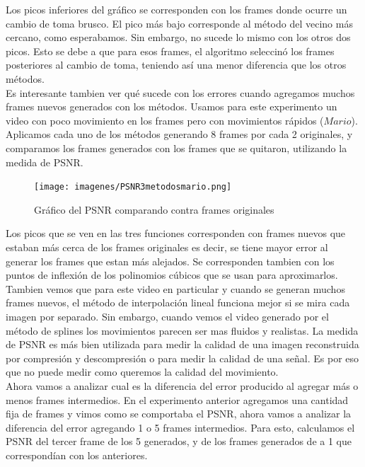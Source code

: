 Los picos inferiores del gráfico se corresponden con los frames donde ocurre un cambio de toma brusco. El pico más bajo corresponde al método del vecino más cercano, como esperabamos. Sin embargo, no sucede lo mismo con los otros dos picos. Esto se debe a que para esos frames, el algoritmo seleccinó los frames posteriores al cambio de toma, teniendo así una menor diferencia que los otros métodos.\\

Es interesante tambien ver qué sucede con los errores cuando agregamos muchos frames nuevos generados con los métodos. Usamos para este experimento un video con poco movimiento en los frames pero con movimientos rápidos ($Mario$). Aplicamos cada uno de los métodos generando 8 frames por cada 2 originales, y comparamos los frames generados con los frames que se quitaron, utilizando la medida de PSNR.

\begin{figure}[h!]
  \caption{Gráfico del PSNR comparando contra frames originales}
  \centering
    \texttt{[image: imagenes/PSNR3metodosmario.png]}
\end{figure}


Los picos que se ven en las tres funciones corresponden con frames nuevos que estaban más cerca de los frames originales es decir, se tiene mayor error al generar los frames que estan más alejados. Se corresponden tambien con los puntos de inflexión de los polinomios cúbicos que se usan para aproximarlos.\\

Tambien vemos que para este video en particular y cuando se generan muchos frames nuevos, el método de interpolación lineal funciona mejor si se mira cada imagen por separado. Sin embargo, cuando vemos el video generado por el método de splines los movimientos parecen ser mas fluidos y realistas. La medida de PSNR es más bien utilizada para medir la calidad de una imagen reconstruida por compresión y descompresión o para medir la calidad de una señal. Es por eso que no puede medir como queremos la calidad del movimiento.\\


Ahora vamos a analizar cual es la diferencia del error producido al agregar más o menos frames intermedios. En el experimento anterior agregamos una cantidad fija de frames y vimos como se comportaba el PSNR, ahora vamos a analizar la diferencia del error agregando 1 o 5 frames intermedios. Para esto, calculamos el PSNR del tercer frame de los 5 generados, y de los frames generados de a 1 que correspondían con los anteriores. 

